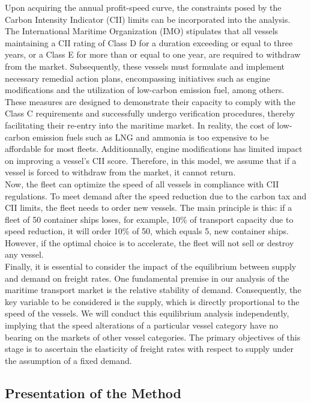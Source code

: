 \documentclass[a4paper,12pt]{article}
\begin{document}
Upon acquiring the annual profit-speed curve, the constraints posed by the Carbon Intensity Indicator (CII) limits can be incorporated into the analysis.
The International Maritime Organization (IMO) stipulates that all vessels maintaining a CII rating of Class D for a duration exceeding or equal to three years, or a Class E for more than or equal to one year, are required to withdraw from the market.
Subsequently, these vessels must formulate and implement necessary remedial action plans, encompassing initiatives such as engine modifications and the utilization of low-carbon emission fuel, among others.
These measures are designed to demonstrate their capacity to comply with the Class C requirements and successfully undergo verification procedures, thereby facilitating their re-entry into the maritime market.
In reality, the cost of low-carbon emission fuels such as LNG and ammonia is too expensive to be affordable for most fleets.
Additionnally, engine modifications has limited impact on improving a vessel's CII score.
Therefore, in this model, we assume that if a vessel is forced to withdraw from the market, it cannot return.\\

Now, the fleet can optimize the speed of all vessels in compliance with CII regulations.
To meet demand after the speed reduction due to the carbon tax and CII limits, the fleet needs to order new vessels.
The main principle is this: if a fleet of 50 container ships loses, for example, 10\% of transport capacity due to speed reduction, it will order 10\% of 50, which equals 5, new container ships.
However, if the optimal choice is to accelerate, the fleet will not sell or destroy any vessel.\\

Finally, it is essential to consider the impact of the equilibrium between supply and demand on freight rates.
One fundamental premise in our analysis of the maritime transport market is the relative stability of demand.
Consequently, the key variable to be considered is the supply, which is directly proportional to the speed of the vessels. We will conduct this equilibrium analysis independently, implying that the speed alterations of a particular vessel category have no bearing on the markets of other vessel categories.
The primary objectives of this stage is to ascertain the elasticity of freight rates with respect to supply under the assumption of a fixed demand.\\


\subsection{Presentation of the Method}
\end{document}

